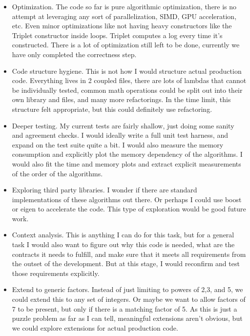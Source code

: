 \documentclass{article}
\begin{document}
\begin{itemize}
    \item Optimization. The code so far is pure algorithmic optimization, there is no attempt at leveraging any sort of parallelization, SIMD, GPU acceleration, etc. Even minor optimizations like not having heavy constructors like the Triplet constructor inside loops. Triplet computes a log every time it's constructed. There is a lot of optimization still left to be done, currently we have only completed the correctness step.

    \item Code structure hygiene. This is not how I would structure actual production code. Everything lives in 2 coupled files, there are lots of lambdas that cannot be individually tested, common math operations could be split out into their own library and files, and many more refactorings. In the time limit, this structure felt appropriate, but this could definitely use refactoring.

    \item Deeper testing. My current tests are fairly shallow, just doing some sanity and agreement checks. I would ideally write a full unit test harness, and expand on the test suite quite a bit. I would also measure the memory consumption and explicitly plot the memory dependency of the algorithms. I would also fit the time and memory plots and extract explicit measurements of the order of the algorithms.

    \item Exploring third party libraries. I wonder if there are standard implementations of these algorithms out there. Or perhaps I could use boost or eigen to accelerate the code. This type of exploration would be good future work.

    \item Context analysis. This is anything I can do for this task, but for a general task I would also want to figure out why this code is needed, what are the contracts it needs to fulfill, and make sure that it meets all requirements from the outset of the development. But at this stage, I would reconfirm and test those requirements explicitly.

    \item Extend to generic factors. Instead of just limiting to powers of 2,3, and 5, we could extend this to any set of integers. Or maybe we want to allow factors of 7 to be present, but only if there is a matching factor of 5. As this is just a puzzle problem as far as I can tell, meaningful extensions aren't obvious, but we could explore extensions for actual production code.
\end{itemize}
\end{document}
